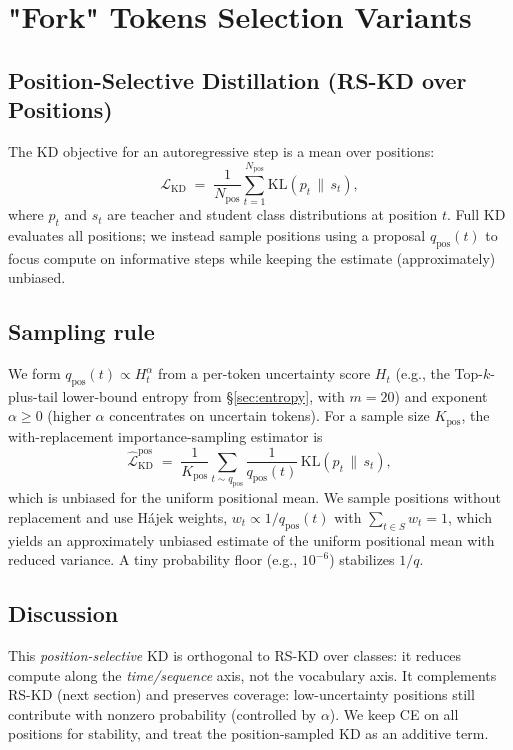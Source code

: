 \documentclass[11pt]{article}
\begin{document}
\section{"Fork" Tokens Selection Variants}
\subsection{Position-Selective Distillation (RS-KD over Positions)}
\label{sec:posrs}

The KD objective for an autoregressive step is a mean over positions:
\[
	\mathcal{L}_{\text{KD}} \;=\; \frac{1}{N_{\text{pos}}} \sum_{t=1}^{N_{\text{pos}}}
	\mathrm{KL}\!\left(p_t \,\|\, s_t\right),
\]
where $p_t$ and $s_t$ are teacher and student class distributions at position $t$.
Full KD evaluates all positions; we instead sample positions using a proposal
$q_{\text{pos}}(t)$ to focus compute on informative steps while keeping the estimate (approximately) unbiased.

\subsection{Sampling rule}
We form $q_{\text{pos}}(t) \propto H_t^\alpha$ from a per-token uncertainty score $H_t$
(e.g., the Top-$k$-plus-tail lower-bound entropy from \S\ref{sec:entropy}, with $m{=}20$) and exponent $\alpha\!\ge\!0$ (higher $\alpha$ concentrates on uncertain tokens). For a sample size $K_{\text{pos}}$, the with-replacement importance-sampling estimator is
\[
	\widehat{\mathcal{L}}_{\text{KD}}^{\text{pos}} \;=\;
	\frac{1}{K_{\text{pos}}} \sum_{t \sim q_{\text{pos}}}
	\frac{1}{q_{\text{pos}}(t)} \,\mathrm{KL}\!\left(p_t \,\|\, s_t\right),
\]
which is unbiased for the uniform positional mean. We sample positions without replacement and use Hájek weights, $w_t \propto 1/q_{\text{pos}}(t)$ with $\sum_{t\in S} w_t = 1$, which yields an approximately unbiased estimate of the uniform positional mean with reduced variance.
A tiny probability floor (e.g., $10^{-6}$) stabilizes $1/q$.

\subsection{Discussion}
This \emph{position-selective} KD is orthogonal to RS-KD over classes: it reduces compute along the \emph{time/sequence} axis, not the vocabulary axis. It complements RS-KD (next section) and preserves coverage: low-uncertainty positions still contribute with nonzero probability (controlled by $\alpha$).
We keep CE on all positions for stability, and treat the position-sampled KD as an additive term.
\end{document}
